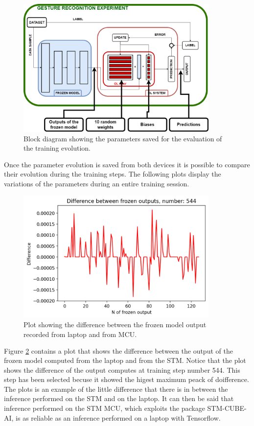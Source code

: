 \documentclass[12pt]{report}
\begin{document}
\begin{figure}[h!]
    \centering
    \includegraphics[width=100mm]{Figures/Chapter5/evolution.png} 
    \caption{Block diagram showing the parameters saved for the evaluation of the training evolution.}
    \label{fig:evolution_params}    
\end{figure}

Once the parameter evolution is saved from both devices it is possible to compare their evolution during the training steps. The following plots display the variations of the parameters during an entire training session. 

\begin{figure}[h!]
    \centering
    \includegraphics[width=100mm]{Figures/Chapter5/frozen_example.png} 
    \caption{Plot showing the difference between the frozen model output recorded from laptop and from MCU.}
    \label{fig:comparison_frozen}    
\end{figure}

Figure \ref{fig:comparison_frozen} contains a plot that shows the difference between the output of the frozen model computed from the laptop and from the STM. Notice that the plot shows the difference of the output computes at training step number 544. This step has been selected becuse it showed the higest maximum peack of doifference. The plots is an example of the little difference that there is in between the inference performed on the STM and on the laptop. It can then be said that inference performed on the STM MCU, which exploits the package STM-CUBE-AI, is as reliable as an inference performed on a laptop with Tensorflow.
\end{document}
